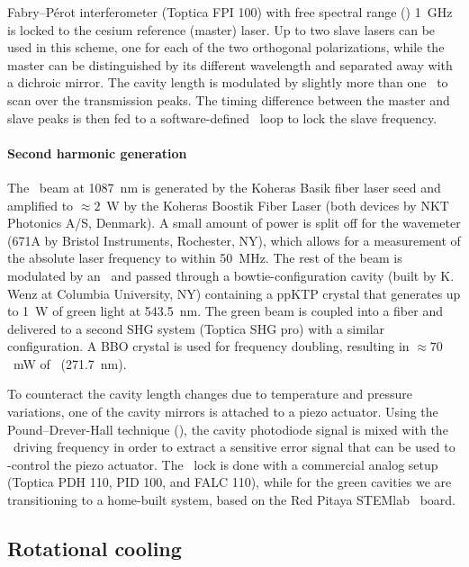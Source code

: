 Fabry--P\'erot interferometer (Toptica FPI 100) with free spectral range
(\FSR) 1~GHz is locked to the cesium reference (master) laser. Up to two slave
lasers can be used in this scheme, one for each of the two orthogonal
polarizations, while the master can be distinguished by its different wavelength
and separated away with a dichroic mirror. The cavity length is modulated by
slightly more than one \FSR\ to scan over the transmission peaks. The timing
difference between the master and slave peaks is then fed to a software-defined
\PID\ loop to lock the slave frequency.

\paragraph{Second harmonic generation}

The \IR\ beam at 1087~nm is generated by the Koheras Basik fiber laser seed and
amplified to $\approx2$~W by the Koheras Boostik Fiber Laser (both devices by
NKT Photonics A/S, Denmark). A small amount of power is split off for the
wavemeter (671A by Bristol Instruments, Rochester, NY), which allows for a
measurement of the absolute laser frequency to within 50~MHz. The rest of the
beam is modulated by an \EOM\ and passed through a bowtie-configuration cavity
(built by K. Wenz at Columbia University, NY) containing a ppKTP crystal that
generates up to 1~W of green light at 543.5~nm. The green beam is coupled into a
fiber and delivered to a second \gls{SHG} system (Toptica SHG pro) with a
similar configuration. A BBO crystal is used for frequency doubling, resulting
in $\approx70$~mW of \UV\ (271.7~nm).

To counteract the cavity length changes due to temperature and pressure
variations, one of the cavity mirrors is attached to a piezo actuator. Using the
Pound--Drever-Hall technique (\PDH), the cavity photodiode signal is mixed with
the \EOM\ driving frequency in order to extract a sensitive error signal that
can be used to \PID-control the piezo actuator. \cite{drever1983laser} The \UV\
lock is done with a commercial analog setup (Toptica PDH 110, PID 100, and FALC
110), while for the green cavities we are transitioning to a home-built system,
based on the Red Pitaya STEMlab \FPGA\ board.

\subsection{Rotational cooling}
\label{sect:rotcool}


